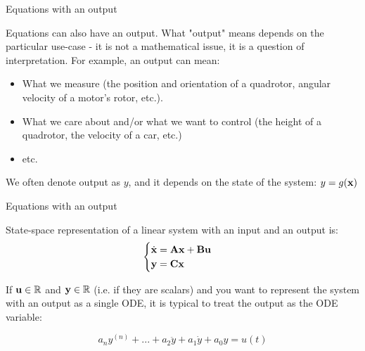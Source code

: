 \documentclass{beamer}
\begin{document}
\begin{frame}{Equations with an output}
	\begin{flushleft}
		
		Equations can also have an output. What "output" means depends on the particular use-case - it is not a mathematical issue, it is a question of interpretation. For example, an output can mean:
		
		\begin{itemize}
			\item What we measure (the position and orientation of a quadrotor, angular velocity of a motor's rotor, etc.).
			
			\item What we care about and/or what we want to control (the height of a quadrotor, the velocity of a car, etc.)
			
			\item etc.
		\end{itemize}
		
		We often denote output as $y$, and it depends on the state of the system: $y = g(\mathbf{x})$
		
	\end{flushleft}
\end{frame}


\begin{frame}{Equations with an output}
	\begin{flushleft}
		
		State-space representation of a linear system with an input and an output is:
		\begin{equation}
		\begin{cases}
				\dot{\mathbf{x}} = \mathbf{A} \mathbf{x} + \mathbf{B}\mathbf{u} \\
				\mathbf{y} = \mathbf{C}\mathbf{x}
		\end{cases}
		\end{equation}
		
		If $\mathbf{u} \in \mathbb{R}$ and $\mathbf{y} \in \mathbb{R}$ (i.e. if they are scalars) and you want to represent the system with an output as a single ODE, it is typical to treat the output as the ODE variable:
		
		\begin{equation}
			a_n y^{(n)} + 
			... +
			a_2 \ddot{y} + a_1 \dot{y} + 
			a_0 y = u(t)
		\end{equation}
		
	\end{flushleft}
\end{frame}
\end{document}
